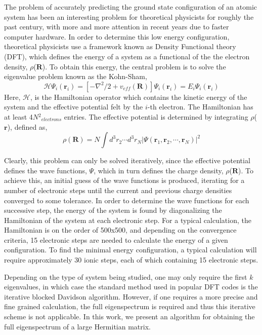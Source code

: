 \documentclass[twocolumn]{article}
\begin{document}
\indent \indent The problem of accurately predicting the ground state configuration of an atomic system has been an interesting problem for theoretical physicists for roughly the past century, with more and more attention in recent years due to faster computer hardware.  In order to determine this low energy configuration, theoretical physicists use a framework known as Density Functional theory (DFT), which defines the energy of a system as a functional of the the electron density, $\rho$($\bm{R}$).  To obtain this energy, the central problem is to solve the eigenvalue problem known as the Kohn-Sham\cite{KH,KS},
\begin{equation}\label{eq:KS}
\mathcal{H}\Psi_{i}(\bm{r}_{i}) = \left[-\nabla^{2}/2 + v_{eff}(\bm{R}) \right]\Psi_{i}(\bm{r}_{i}) = E_{i}\Psi_{i}(\bm{r}_{i})
\end{equation}
Here, $\mathcal{H}$, is the Hamiltonian operator which contains the kinetic energy of the system and the effective potential felt by the $i$-th electron.  The Hamiltonian has at least 4$N$$^{2}$$_{electrons}$ entries. The  effective potential is determined by integrating $\rho$($\bm{r}$), defined as,
\begin{equation}\label{eq:rho}
\rho(\bm{R}) = N \int d^{3}r_{2}\cdots d^{3}r_{N}|\Psi(\bm{r}_{1},\bm{r}_{2},\cdots,\bm{r}_{N})|^{2}
\end{equation}

Clearly, this problem can only be solved iteratively, since the effective potential defines the wave functions, $\Psi$, which in turn defines the charge density, $\rho$($\bm{R}$).  To achieve this, an initial guess of the wave functions is produced, iterating for a number of electronic steps until the current and previous charge densities converged to some tolerance.  In order to determine the wave functions for each successive step, the energy of the system is found by diagonalizing the Hamiltonian of the system at each electronic step.  For a typical calculation, the Hamiltonian is on the order of 500x500, and depending on the convergence criteria, 15 electronic steps are needed to calculate the energy of a given configuration.  To find the minimal energy configuration, a typical calculation will require approximately 30 ionic steps, each of which containing 15 electronic steps.

Depending on the type of system being studied, one may only require the first $k$ eigenvalues, in which case the standard method used in popular DFT codes is the iterative blocked Davidson algorithm\cite{davidson,lowestvals}.  However, if one requires a more precise and fine grained calculation, the full eigenspectrum is required and thus this iterative scheme is not applicable.  In this work, we present an algorithm for obtaining the full eigenspectrum of a large Hermitian matrix.
\end{document}
